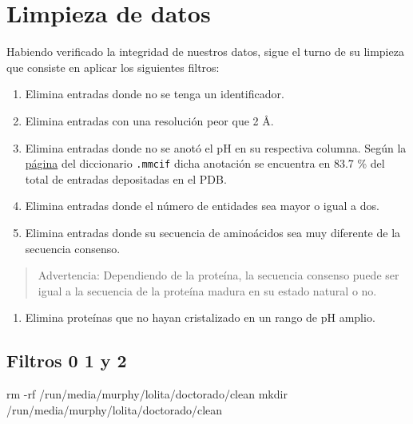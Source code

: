 \documentclass[
]{book}
\newenvironment{Shaded}{\begin{snugshade}}{\end{snugshade}}
\newcommand{\FunctionTok}[1]{\textcolor[rgb]{0.00,0.00,0.00}{#1}}
\newcommand{\NormalTok}[1]{#1}
\providecommand{\tightlist}{%
  \setlength{\itemsep}{0pt}\setlength{\parskip}{0pt}}
\begin{document}
\hypertarget{limpieza-de-datos}{%
\chapter{Limpieza de datos}\label{limpieza-de-datos}}

Habiendo verificado la integridad de nuestros datos, sigue el turno de su limpieza que consiste en aplicar los siguientes filtros:

\begin{enumerate}
\def\labelenumi{\arabic{enumi}.}
\setcounter{enumi}{-1}
\tightlist
\item
  Elimina entradas donde no se tenga un identificador.
\item
  Elimina entradas con una resolución peor que 2 Å.
\item
  Elimina entradas donde no se anotó el pH en su respectiva columna. Según la \href{http://mmcif.wwpdb.org/dictionaries/mmcif_pdbx_v50.dic/Categories/exptl_crystal_grow.html}{página} del diccionario \texttt{.mmcif} dicha anotación se encuentra en 83.7 \% del total de entradas depositadas en el PDB.
\item
  Elimina entradas donde el número de entidades sea mayor o igual a dos.
\item
  Elimina entradas donde su secuencia de aminoácidos sea muy diferente de la secuencia consenso.
\end{enumerate}

\begin{quote}
Advertencia: Dependiendo de la proteína, la secuencia consenso puede ser igual a la secuencia de la proteína madura en su estado natural o no.
\end{quote}

\begin{enumerate}
\def\labelenumi{\arabic{enumi}.}
\setcounter{enumi}{4}
\tightlist
\item
  Elimina proteínas que no hayan cristalizado en un rango de pH amplio.
\end{enumerate}

\hypertarget{filtros-0-1-y-2}{%
\section{Filtros 0 1 y 2}\label{filtros-0-1-y-2}}

\begin{Shaded}
\begin{Highlighting}[]
\FunctionTok{rm}\NormalTok{ {-}rf /run/media/murphy/lolita/doctorado/clean}
\FunctionTok{mkdir}\NormalTok{ /run/media/murphy/lolita/doctorado/clean}
\end{Highlighting}
\end{Shaded}
\end{document}
